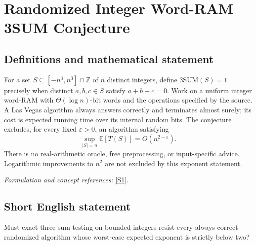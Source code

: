 \documentclass[11pt,a4paper]{article}
\newcommand{\Z}{\mathbb{Z}}
\newcommand{\E}{\mathbb{E}}
\newcommand{\eps}{\varepsilon}
\newcommand{\sref}[2]{\hyperlink{source:#1:#2}{[S#2]}}
\newif\ifshowcatalogue
\newcommand{\cataloguescope}[1]{\ifshowcatalogue
 \paragraph{Exact scope in the supplied catalogue.}
 \begin{quote}\small #1\end{quote}\fi}
\numberwithin{equation}{section}
\begin{document}
\setcounter{section}{0}
\clearpage
\section*{\texorpdfstring{Randomized Integer Word-RAM 3SUM Conjecture}{Randomized Integer Word-RAM 3SUM Conjecture}}\label{statement}
\subsection{Definitions and mathematical statement}
For a set $S\subseteq[-n^3,n^3]\cap\Z$ of $n$ distinct integers, define
$\mathrm{3SUM}(S)=1$ precisely when distinct $a,b,c\in S$ satisfy $a+b+c=0$. Work on a uniform integer word-RAM with $\Theta(\log n)$-bit words and the operations specified by the source. A Las Vegas algorithm always answers correctly and terminates almost surely; its cost is expected running time over its internal random bits. The conjecture excludes, for every fixed $\eps>0$, an algorithm satisfying
\[
 \sup_{|S|=n}\E[T(S)]=O(n^{2-\eps}).
\]
There is no real-arithmetic oracle, free preprocessing, or input-specific advice. Logarithmic improvements to $n^2$ are not excluded by this exponent statement.
\par\smallskip\textit{Formulation and concept references:} \sref{statement}{1}.
\cataloguescope{For every epsilon>0, there is no uniform Las Vegas randomized integer word-RAM algorithm that, on every set S of n distinct integers in [-n\textasciicircum{}3,n\textasciicircum{}3], decides whether three distinct elements sum to zero in worst-case expected O(n\textasciicircum{}(2-epsilon)) time. Use the standard logarithmic-word model of Abboud–Vassilevska Williams Conjecture 1, with enough Theta(log n) bits for the input universe, unit-cost word arithmetic, comparisons, Boolean operations, shifts and indirect memory access; no real-number oracle or free input-dependent preprocessing is permitted. Las Vegas means an always-correct answer with almost-sure termination, expectation over internal randomness, and a bound uniform over all valid inputs. Constants may depend on the algorithm and epsilon. This is not a literal quadratic lower bound.}
\subsection{Short English statement}
Must exact three-sum testing on bounded integers resist every always-correct randomized algorithm whose worst-case expected exponent is strictly below two?
\end{document}
